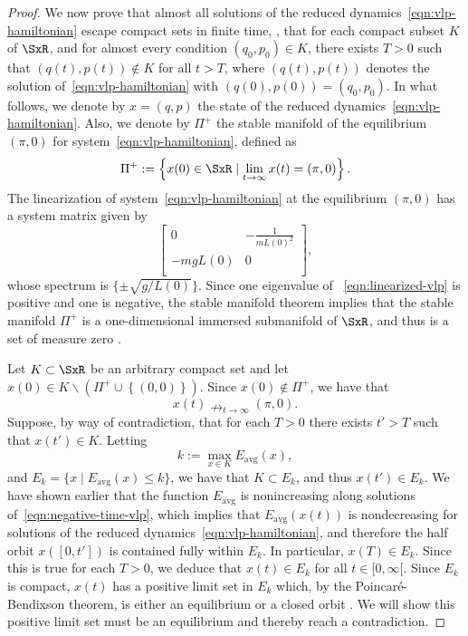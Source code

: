 \begin{proof}
We now prove that almost all solutions of the reduced
dynamics~\eqref{eqn:vlp-hamiltonian} escape compact sets in finite
time, \ie, that for each compact subset \(K\) of 
\(\SxR\), and for almost every condition 
\( (q_0,p_0) \in K \), there exists \( T > 0\) such that
\( (q(t),p(t)) \notin K \) for all \( t > T \), where \( (q(t),p(t)) \)
denotes the solution of~\eqref{eqn:vlp-hamiltonian} with 
\( (q(0),p(0)) = (q_0,p_0)\). 
In what follows, we denote by \( x = (q,p) \) the state of the reduced
dynamics~\eqref{eqn:vlp-hamiltonian}. 
Also, we denote by \(\Pi^+\) the stable manifold of the equilibrium \((\pi,0)\)
for system~\eqref{eqn:vlp-hamiltonian}, defined as
\[
   \Pi^+ := \left\{ x(0) \in \SxR \mid
   \lim_{t \to \infty} x(t) = (\pi, 0) \right\}.
\]
The linearization of system~\eqref{eqn:vlp-hamiltonian} at the
equilibrium \((\pi,0)\) has a system matrix given by
\begin{equation}\label{eqn:linearized-vlp}
   \begin{bmatrix}
      0 & -\frac{1}{mL(0)^2} \\
      -m g L(0) & 0 \\
   \end{bmatrix}
   ,
\end{equation}
whose spectrum is \(\{\pm \sqrt{{g}/{L(0)}}\}\).  
Since one eigenvalue of ~\eqref{eqn:linearized-vlp} is positive and one is
negative, the stable manifold theorem implies that the stable manifold 
\( \Pi^+ \) is a one-dimensional immersed submanifold of
\(\SxR\), and thus is a set of measure zero
\cite{stable_manifold}.

Let \( K \subset \SxR\) be an arbitrary compact set and let 
\( x(0) \in K \backslash \left(\Pi^+ \cup \left\{(0,0)\right\}\right)\).
Since \( x(0) \notin \Pi^+ \), we have that
\begin{equation}\label{eqn:vlp-x-does-not-converge}
   x(t) \nrightarrow_{t \to \infty} (\pi,0).
\end{equation}
Suppose, by way of contradiction, that for each \(T > 0\) there exists 
\(t' > T\) such that \(x(t') \in K\).  
Letting
\[
   k := \max\limits_{x \in K} E_\text{avg}(x)
   ,
\] 
and \(E_k =\{ x \mid E_\text{avg}(x) \leq k\} \), we have that 
\( K \subset E_k \), and thus \(x(t') \in E_k\).
We have shown earlier that the function \( E_\text{avg} \) is nonincreasing
along solutions of~\eqref{eqn:negative-time-vlp}, which implies that
\( E_\text{avg}(x(t)) \) is nondecreasing for solutions of the reduced
dynamics~\eqref{eqn:vlp-hamiltonian}, and therefore the half orbit \(x([0,t'])\)
is contained fully within \(E_k\).  
In particular, \(x(T) \in E_k\). Since this is true for each \( T >0 \), we
deduce that \(x(t) \in E_k\) for all \(t \in [0,\infty[\).  
Since \(E_k\) is compact, \(x(t)\) has a positive limit set in \(E_k\) which, by
the Poincar\'{e}-Bendixson theorem, is either an equilibrium or a closed orbit
\cite{poincare_bendixson}.  
We will show this positive limit set must be an equilibrium and thereby reach a
contradiction.


\end{proof}
